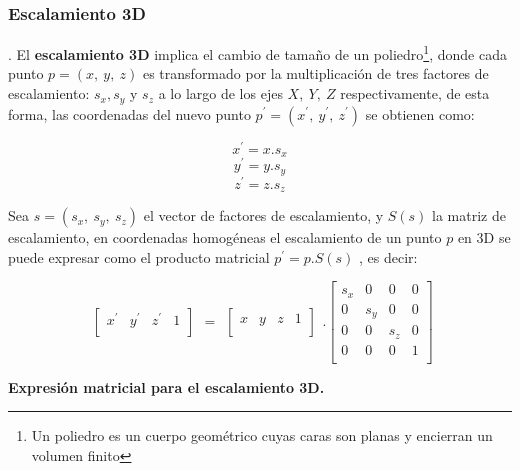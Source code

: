 \clearpage
\subsubsection{Escalamiento 3D}
 \citep{Matias2007}.
El \textbf{escalamiento 3D} implica el cambio de tamaño de un poliedro\footnote{Un poliedro es un cuerpo geométrico cuyas caras son planas y encierran un volumen finito}, donde cada punto $p = (x,\ y,\ z)$ es transformado por la multiplicación de tres factores de escalamiento: $s_{x}, s_{y}$ y $s_{z}$ a lo largo de los ejes $X,\ Y,\ Z$ respectivamente, de esta forma, las coordenadas del nuevo punto $p^{\prime} = ({x}^{ \prime},\ {y}^{ \prime},\ {z}^{ \prime})$ se obtienen como:

$${x}^{\prime} = x.s_{x}$$
$${y}^{\prime} = y.s_{y}$$
$${z}^{\prime} = z.s_{z}$$

Sea $s = (s_{x},\ s_{y},\ s_{z})$ el vector de factores de escalamiento, y $S(s)$ la matriz de
escalamiento, en coordenadas homogéneas el escalamiento de un punto $p$ en 3D se puede expresar como el producto matricial
$p^{\prime} = p.S(s)$ , es decir:

\begin{equation}
\begin{array}{rccl}
\left[
\begin{array}{rccl}
{x}^{\prime} & {y}^{\prime} & {z}^{\prime} & 1\\
\end{array}
\right]
\end{array}
=
\begin{array}{rccl}
\left[
\begin{array}{rccl}
x & y & z & 1\\
\end{array}
\right]
\end{array} 
.
\left[
\begin{array}{rccl}
s_{x} & 0 & 0 & 0\\
0 & s_{y} & 0 & 0\\
0 & 0 & s_{z} & 0\\
0 & 0 & 0 & 1\\
\end{array}
\right]   
\end{equation}


\begin{center}
\textbf{\footnotesize{Expresión matricial para el escalamiento 3D.}}
\end{center}


